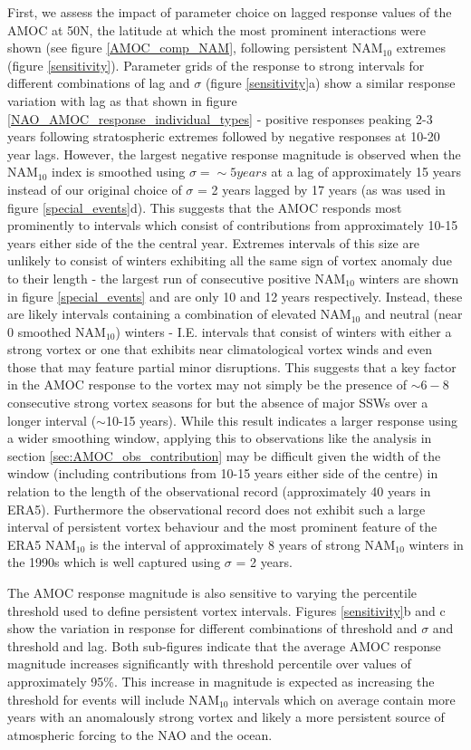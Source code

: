 First, we assess the impact of parameter choice on lagged response values of the AMOC at 50N, the latitude at which the most prominent interactions were shown (see figure \ref{AMOC_comp_NAM}, following persistent NAM$_{10}$ extremes (figure \ref{sensitivity}). Parameter grids of the response to strong intervals for different combinations of lag and $\sigma$ (figure \ref{sensitivity}a) show a similar response variation with lag as that shown in figure \ref{NAO_AMOC_response_individual_types} - positive responses peaking 2-3 years following stratospheric extremes followed by negative responses at 10-20 year lags. However, the largest negative response magnitude is observed when the NAM$_{10}$ index is smoothed using $\sigma = \sim 5 years$ at a lag of approximately 15 years instead of our original choice of $\sigma$ = 2 years lagged by 17 years (as was used in figure \ref{special_events}d). This suggests that the AMOC responds most prominently to intervals which consist of contributions from approximately 10-15 years either side of the the central year. Extremes intervals of this size are unlikely to consist of winters exhibiting all the same sign of vortex anomaly due to their length - the largest run of consecutive positive NAM$_{10}$ winters are shown in figure \ref{special_events} and are only 10 and 12 years respectively. Instead, these are likely intervals containing a combination of elevated NAM$_{10}$ and neutral (near 0 smoothed NAM$_{10}$) winters - I.E. intervals that consist of winters with either a strong vortex or one that exhibits near climatological vortex winds and even those that may feature partial minor disruptions. This suggests that a key factor in the AMOC response to the vortex may not simply be the presence of $\sim 6-8$ consecutive strong vortex seasons for but the absence of major SSWs over a longer interval ($\sim$10-15 years). While this result indicates a larger response using a wider smoothing window, applying this to observations like the analysis in section \ref{sec:AMOC_obs_contribution} may be difficult given the width of the window (including contributions from 10-15 years either side of the centre) in relation to the length of the observational record (approximately 40 years in ERA5). Furthermore the observational record does not exhibit such a large interval of persistent vortex behaviour and the most prominent feature of the ERA5 NAM$_{10}$ is the interval of approximately 8 years of strong NAM$_{10}$ winters in the 1990s which is well captured using $\sigma$ = 2 years. 

The AMOC response magnitude is also sensitive to varying the percentile threshold used to define persistent vortex intervals. Figures \ref{sensitivity}b and c show the variation in response for different combinations of threshold and $\sigma$ and threshold and lag. Both sub-figures indicate that the average AMOC response magnitude increases significantly with threshold percentile over values of approximately 95\%. This increase in magnitude is expected as increasing the threshold for events will include NAM$_{10}$ intervals which on average contain more years with an anomalously strong vortex and likely a more persistent source of atmospheric forcing to the NAO and the ocean. 


